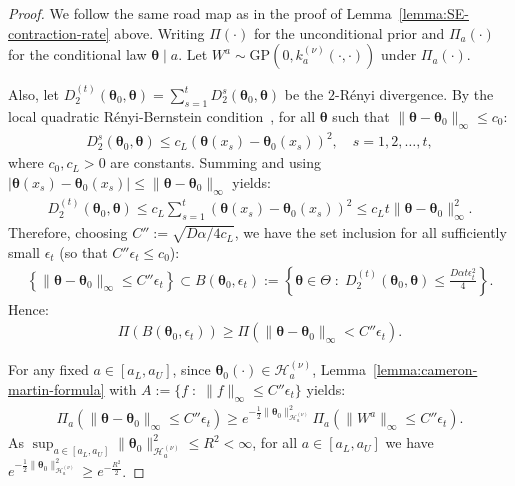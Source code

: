 \documentclass[final,12pt]{colt2026} %
\begin{document}
\begin{proof}
We follow the same road map as in the proof of Lemma~\ref{lemma:SE-contraction-rate} above. Writing $\Pi(\cdot)$ for the unconditional prior and $\Pi_a(\cdot)$ for the conditional law $\pmb\theta \mid a$. Let $W^{a} \sim \mathrm{GP}(0, k^{(\nu)}_a(\cdot, \cdot))$ under $\Pi_a(\cdot)$. 

Also, let $D_2^{(t)}(\pmb\theta_0, \pmb\theta) = \sum_{s=1}^{t}D_2^s(\pmb\theta_0, \pmb\theta)$ be the $2$-R\'{e}nyi divergence. By the local quadratic R\'{e}nyi-Bernstein condition~\citep{ghosal2000convergence,kleijn2006misspecification,bhattacharya2019bayesian}, for all $\pmb\theta$ such that $\lVert \pmb\theta-\pmb\theta_0\rVert_{\infty} \leq c_0$:
\begin{align*}
D_2^s(\pmb\theta_0, \pmb\theta) \leq c_L (\pmb\theta(x_s) - \pmb\theta_0(x_s))^2,\quad s = 1, 2, \ldots, t,
\end{align*}
where $c_0, c_L > 0$ are constants. Summing and using $|\pmb\theta(x_s) - \pmb\theta_0(x_s)| \leq \lVert \pmb\theta-\pmb\theta_0\rVert_{\infty}$ yields:
\begin{align*}
D_2^{(t)}(\pmb\theta_0, \pmb\theta) \leq c_L\sum_{s=1}^{t}(\pmb\theta(x_s) - \pmb\theta_0(x_s))^2 \leq c_L t\lVert\pmb\theta-\pmb\theta_0\rVert_{\infty}^{2}.
\end{align*}
Therefore, choosing $C'' := \sqrt{D\alpha / 4 c_L}$, we have the set inclusion for all sufficiently small $\epsilon_t$ (so that $C''\epsilon_t \leq c_0$):
\begin{align*}
\left\{\lVert \pmb\theta-\pmb\theta_0\rVert_{\infty} \leq C''\epsilon_t\right\} \subset B(\pmb\theta_0, \epsilon_t):= \left\{\pmb\theta\in \Theta\;:\;D_2^{(t)}(\pmb\theta_0, \pmb\theta) \leq \frac{D\alpha t \epsilon_t^{2}}{4}\right\}.
\end{align*}
Hence:
\begin{align*}
\Pi\left(B(\pmb\theta_0, \epsilon_t)\right) \geq \Pi\left(\lVert \pmb\theta-\pmb\theta_0\rVert_{\infty} < C'' \epsilon_t\right).
\end{align*}

For any fixed $a\in [a_L, a_U]$, since $\pmb\theta_0(\cdot) \in \mathcal{H}_a^{(\nu)}$, Lemma~\ref{lemma:cameron-martin-formula} with $A:= \{f\;:\; \lVert f\rVert_{\infty} \leq C''\epsilon_t\}$ yields:
\begin{align}
\label{eq:matern-contraction-1}
\Pi_a\left(\lVert \pmb\theta-\pmb\theta_0\rVert_{\infty} \leq C''\epsilon_t\right) \geq e^{-\frac{1}{2}\lVert \pmb\theta_0\rVert_{\mathcal{H}_a^{(\nu)}}^{2}}\Pi_a\left(\lVert W^{a}\rVert_{\infty} \leq C''\epsilon_t\right).
\end{align}
As $\sup_{a\in [a_L, a_U]}\lVert \pmb\theta_0\rVert_{\mathcal{H}_a^{(\nu)}}^{2} \leq R^{2} < \infty$, for all $a\in [a_L, a_U]$ we have $e^{-\frac{1}{2}\lVert \pmb\theta_0\rVert_{\mathcal{H}_a^{(\nu)}}^{2}} \geq e^{-\frac{R^2}{2}}$.


\end{proof}
\end{document}
